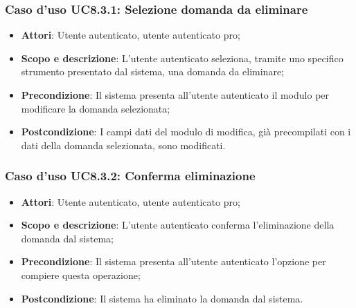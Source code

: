 	\subsubsection{Caso d'uso UC8.3.1: Selezione domanda da eliminare}
	\begin{itemize}
		\item
			\textbf{Attori}: Utente autenticato, utente autenticato pro;
		\item
			\textbf{Scopo e descrizione}: L'utente autenticato seleziona, tramite uno specifico strumento presentato dal sistema, una domanda da eliminare;
		\item		
			\textbf{Precondizione}: Il sistema presenta all'utente autenticato il modulo per modificare la domanda selezionata;
		\item
			\textbf{Postcondizione}: I campi dati del modulo di modifica, già precompilati con i dati della domanda selezionata, sono modificati.
	\end{itemize}		
	\subsubsection{Caso d'uso UC8.3.2: Conferma eliminazione}
	\begin{itemize}
		\item
			\textbf{Attori}: Utente autenticato, utente autenticato pro;
		\item
			\textbf{Scopo e descrizione}: L'utente autenticato conferma l'eliminazione della domanda dal sistema;
		\item		
			\textbf{Precondizione}: Il sistema presenta all'utente autenticato l'opzione per compiere questa operazione;
		\item
			\textbf{Postcondizione}: Il sistema ha eliminato la domanda dal sistema.
	\end{itemize}	
